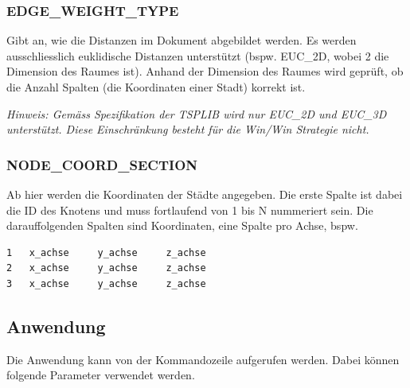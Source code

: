 \documentclass[11pt,a4paper]{article}
\begin{document}
\subsubsection{EDGE\_WEIGHT\_TYPE}
Gibt an, wie die Distanzen im Dokument abgebildet werden. Es werden ausschliesslich euklidische Distanzen unterstützt (bspw. EUC\_2D, wobei 2 die Dimension des Raumes ist).
Anhand der Dimension des Raumes wird geprüft, ob die Anzahl Spalten (die Koordinaten einer Stadt) korrekt ist.

\emph{Hinweis: Gemäss Spezifikation der TSPLIB wird nur EUC\_2D und EUC\_3D unterstützt. Diese Einschränkung besteht für die Win/Win Strategie nicht.}

\subsubsection{NODE\_COORD\_SECTION}
Ab hier werden die Koordinaten der Städte angegeben. Die erste Spalte ist dabei die ID des Knotens und muss fortlaufend von 1 bis N nummeriert sein. Die darauffolgenden Spalten sind Koordinaten, eine Spalte pro Achse, bspw.

\begin{verbatim}
1   x_achse     y_achse     z_achse
2   x_achse     y_achse     z_achse
3   x_achse     y_achse     z_achse
\end{verbatim}

\subsection{Anwendung}
Die Anwendung kann von der Kommandozeile aufgerufen werden. Dabei können folgende Parameter verwendet werden.
\end{document}
